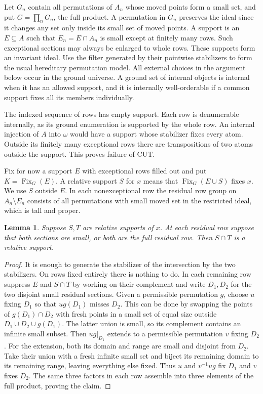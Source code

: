 \documentclass[11pt]{article}
\newtheorem{lemma}[theorem]{Lemma}
\newcommand{\Fix}{\operatorname{Fix}}
\begin{document}
Let $G_n$ contain all permutations of $A_n$ whose moved points form a small set, and put $G=\prod_nG_n$, the full product. A permutation in $G_n$ preserves the ideal since it changes any set only inside its small set of moved points. A support is an $E\subseteq A$ such that $E_n=E\cap A_n$ is small except at finitely many rows. Such exceptional sections may always be enlarged to whole rows. These supports form an invariant ideal. Use the filter generated by their pointwise stabilizers to form the usual hereditary permutation model. All external choices in the argument below occur in the ground universe. A ground set of internal objects is internal when it has an allowed support, and it is internally well-orderable if a common support fixes all its members individually.

The indexed sequence of rows has empty support. Each row is denumerable internally, as its ground enumeration is supported by the whole row. An internal injection of $A$ into $\omega$ would have a support whose stabilizer fixes every atom. Outside its finitely many exceptional rows there are transpositions of two atoms outside the support. This proves failure of $\mathrm{CUT}$.

Fix for now a support $E$ with exceptional rows filled out and put $K=\Fix_G(E)$. A relative support $S$ for $x$ means that $\Fix_G(E\cup S)$ fixes $x$. We use $S$ outside $E$. In each nonexceptional row the residual row group on $A_n\setminus E_n$ consists of all permutations with small moved set in the restricted ideal, which is tall and proper.

\begin{lemma}\label{intersect}
Suppose $S,T$ are relative supports of $x$. At each residual row suppose that both sections are small, or both are the full residual row. Then $S\cap T$ is a relative support.
\end{lemma}
\begin{proof}
It is enough to generate the stabilizer of the intersection by the two stabilizers. On rows fixed entirely there is nothing to do. In each remaining row suppress $E$ and $S\cap T$ by working on their complement and write $D_1,D_2$ for the two disjoint small residual sections. Given a permissible permutation $g$, choose $u$ fixing $D_1$ so that $ug(D_1)$ misses $D_2$. This can be done by swapping the points of $g(D_1)\cap D_2$ with fresh points in a small set of equal size outside $D_1\cup D_2\cup g(D_1)$. The latter union is small, so its complement contains an infinite small subset. Then $ug|_{D_1}$ extends to a permissible permutation $v$ fixing $D_2$. For the extension, both its domain and range are small and disjoint from $D_2$. Take their union with a fresh infinite small set and biject its remaining domain to its remaining range, leaving everything else fixed. Thus $u$ and $v^{-1}ug$ fix $D_1$ and $v$ fixes $D_2$. The same three factors in each row assemble into three elements of the full product, proving the claim.
\end{proof}
\end{document}
